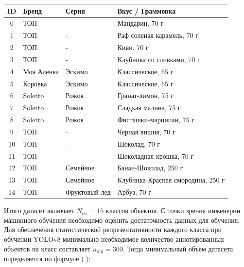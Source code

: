 {{\begin{Center}
    \renewcommand{\arraystretch}{1.4} %
    \begin{tabular}{|c|l|l|l|}
    \hline
      ID & Бренд & Серия & Вкус / Граммовка \\ \hline
      0  & ТОП        & -             & Мандарин, 70 г \\ \hline
      1  & ТОП        & -             & Раф соленая карамель, 70 г \\ \hline
      2  & ТОП        & -             & Киви, 70 г \\ \hline
      3  & ТОП        & -             & Клубника со сливками, 70 г \\ \hline
      4  & Моя Аленка & Эскимо        & Классическое, 65 г \\ \hline
      5  & Коровка    & Эскимо        & Классическое, 65 г \\ \hline
      6  & Soletto    & Рожок         & Гранат-лимон, 75 г \\ \hline
      7  & Soletto    & Рожок         & Сладкая малина, 75 г \\ \hline
      8  & Soletto    & Рожок         & Фисташки-марципан, 75 г \\ \hline
      9  & ТОП        & -             & Черная вишня, 70 г \\ \hline
      10 & ТОП        & -             & Шоколад, 70 г \\ \hline
      11 & ТОП        & -             & Шоколадная крошка, 70 г \\ \hline
      12 & ТОП        & Семейное      & Банан-Шоколад, 250 г \\ \hline
      13 & ТОП        & Семейное      & Клубника-Красная смородина, 250 г \\ \hline
      14 & ТОП        & Фруктовый лед & Арбуз, 70 г \\ \hline
    \end{tabular}
  \end{Center}}
  \botTablespace \addtocounter{tablecntr}{1}

  \par \redline Итого датасет включает $N_{\mathrm{cls}} = 15$ классов объектов. С точки зрения инженерии 
  машинного обучения необходимо оценить достаточность данных для обучения. Для обеспечения статистической 
  репрезентативности каждого класса при обучении YOLOv8 минимально необходимое количество аннотированных 
  объектов на класс составляет $n_{\mathrm{obj}} = 300$. Тогда минимальный объём датасета определяется по 
  формуле (\thechaptercntr .\theformulacntr):

}
